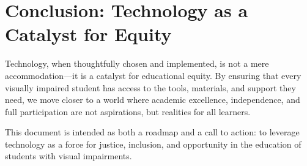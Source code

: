 \section{Conclusion: Technology as a Catalyst for Equity}
\label{sec:intro-conclusion}

Technology, when thoughtfully chosen and implemented, is not a mere accommodation—it is a catalyst for educational equity. By ensuring that every visually impaired student has access to the tools, materials, and support they need, we move closer to a world where academic excellence, independence, and full participation are not aspirations, but realities for all learners.

\bigskip

This document is intended as both a roadmap and a call to action: to leverage technology as a force for justice, inclusion, and opportunity in the education of students with visual impairments.
